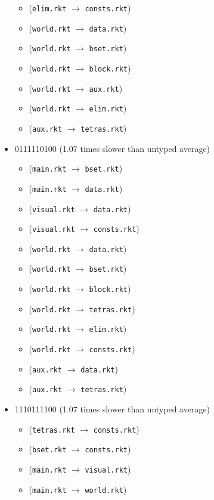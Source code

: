 \documentclass{article}
\newcommand{\mono}[1]{\texttt{#1}}
\begin{document}
\begin{itemize}
\begin{itemize}
  \item (\mono{elim.rkt} $\rightarrow$ \mono{consts.rkt})
  \item (\mono{world.rkt} $\rightarrow$ \mono{data.rkt})
  \item (\mono{world.rkt} $\rightarrow$ \mono{bset.rkt})
  \item (\mono{world.rkt} $\rightarrow$ \mono{block.rkt})
  \item (\mono{world.rkt} $\rightarrow$ \mono{aux.rkt})
  \item (\mono{world.rkt} $\rightarrow$ \mono{elim.rkt})
  \item (\mono{aux.rkt} $\rightarrow$ \mono{tetras.rkt})
  \end{itemize}
\item 0111110100 (1.07 times slower than untyped average)
  \begin{itemize}
  \item (\mono{main.rkt} $\rightarrow$ \mono{bset.rkt})
  \item (\mono{main.rkt} $\rightarrow$ \mono{data.rkt})
  \item (\mono{visual.rkt} $\rightarrow$ \mono{data.rkt})
  \item (\mono{visual.rkt} $\rightarrow$ \mono{consts.rkt})
  \item (\mono{world.rkt} $\rightarrow$ \mono{data.rkt})
  \item (\mono{world.rkt} $\rightarrow$ \mono{bset.rkt})
  \item (\mono{world.rkt} $\rightarrow$ \mono{block.rkt})
  \item (\mono{world.rkt} $\rightarrow$ \mono{tetras.rkt})
  \item (\mono{world.rkt} $\rightarrow$ \mono{elim.rkt})
  \item (\mono{world.rkt} $\rightarrow$ \mono{consts.rkt})
  \item (\mono{aux.rkt} $\rightarrow$ \mono{data.rkt})
  \item (\mono{aux.rkt} $\rightarrow$ \mono{tetras.rkt})
  \end{itemize}
\item 1110111100 (1.07 times slower than untyped average)
  \begin{itemize}
  \item (\mono{tetras.rkt} $\rightarrow$ \mono{consts.rkt})
  \item (\mono{bset.rkt} $\rightarrow$ \mono{consts.rkt})
  \item (\mono{main.rkt} $\rightarrow$ \mono{visual.rkt})
  \item (\mono{main.rkt} $\rightarrow$ \mono{world.rkt})

\end{itemize}
\end{itemize}
\end{document}
